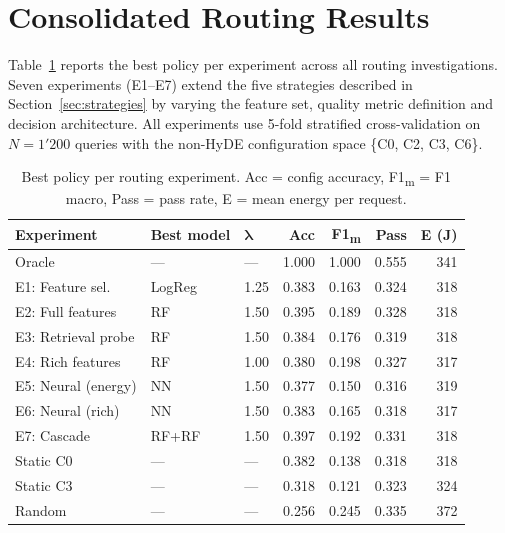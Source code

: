 \newpage
\appendix



\section{Consolidated Routing Results}
\label{app:routing-results}

Table~\ref{tab:app-routing} reports the best policy per experiment across
all routing investigations.  Seven experiments (E1--E7) extend the five
strategies described in Section~\ref{sec:strategies} by varying the feature
set, quality metric definition and decision architecture.  All experiments
use 5-fold stratified cross-validation on $N = 1{'}200$ queries with the
non-HyDE configuration space \{C0, C2, C3, C6\}.

\begin{table}[H]
\centering
\small
\begin{tabular}{l l l r r r r}
\hline
\textbf{Experiment} & \textbf{Best model} & $\bm{\lambda}$ & \textbf{Acc} & \textbf{F1\textsubscript{m}} & \textbf{Pass} & \textbf{E (J)} \\
\hline
Oracle          & ---         & ---  & 1.000 & 1.000 & 0.555 & 341 \\
\hline
E1: Feature sel.       & LogReg & 1.25 & 0.383 & 0.163 & 0.324 & 318 \\
E2: Full features      & RF     & 1.50 & 0.395 & 0.189 & 0.328 & 318 \\
E3: Retrieval probe    & RF     & 1.50 & 0.384 & 0.176 & 0.319 & 318 \\
E4: Rich features      & RF     & 1.00 & 0.380 & 0.198 & 0.327 & 317 \\
E5: Neural (energy)    & NN     & 1.50 & 0.377 & 0.150 & 0.316 & 319 \\
E6: Neural (rich)      & NN     & 1.50 & 0.383 & 0.165 & 0.318 & 317 \\
E7: Cascade            & RF+RF  & 1.50 & 0.397 & 0.192 & 0.331 & 318 \\
\hline
Static C0       & ---         & ---  & 0.382 & 0.138 & 0.318 & 318 \\
Static C3       & ---         & ---  & 0.318 & 0.121 & 0.323 & 324 \\
Random          & ---         & ---  & 0.256 & 0.245 & 0.335 & 372 \\
\hline
\end{tabular}
\caption{Best policy per routing experiment.
         Acc = config accuracy, F1\textsubscript{m} = F1 macro,
         Pass = pass rate, E = mean energy per request.}
\label{tab:app-routing}
\end{table}

